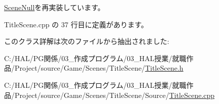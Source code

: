 \mbox{\hyperlink{class_scene_null_abbff54a7323b5ccde4b5094757747738}{Scene\+Null}}を再実装しています。



 Title\+Scene.\+cpp の 37 行目に定義があります。



このクラス詳解は次のファイルから抽出されました\+:\begin{DoxyCompactItemize}
\item 
C\+:/\+H\+A\+L/\+P\+G関係/03\+\_\+作成プログラム/03\+\_\+\+H\+A\+L授業/就職作品/\+Project/source/\+Game/\+Scenes/\+Title\+Scene/\mbox{\hyperlink{_title_scene_8h}{Title\+Scene.\+h}}\item 
C\+:/\+H\+A\+L/\+P\+G関係/03\+\_\+作成プログラム/03\+\_\+\+H\+A\+L授業/就職作品/\+Project/source/\+Game/\+Scenes/\+Title\+Scene/\+Source/\mbox{\hyperlink{_title_scene_8cpp}{Title\+Scene.\+cpp}}\end{DoxyCompactItemize}
